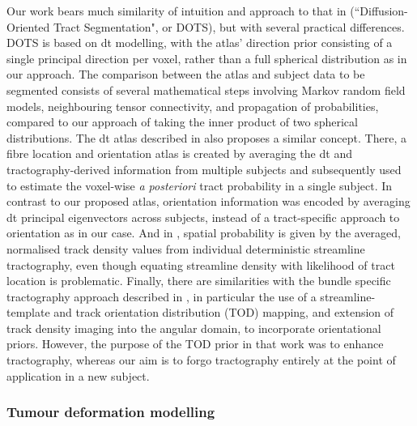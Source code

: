 Our work bears much similarity of intuition and approach to that in \textcite{Bazin2011} (``Diffusion-Oriented Tract Segmentation", or DOTS), but with several practical differences.
DOTS is based on \gls{dt} modelling, with the atlas' direction prior consisting of a single principal direction per voxel, rather than a full spherical distribution as in our approach.
The comparison between the atlas and subject data to be segmented consists of several mathematical steps involving Markov random field models, neighbouring tensor connectivity, and propagation of probabilities, compared to our approach of taking the inner product of two spherical distributions.
The \gls{dt} atlas described in \textcite{Hagler2009} also proposes a similar concept.
There, a fibre location and orientation atlas is created by averaging the \gls{dt} and tractography-derived information from multiple subjects and subsequently used to estimate the voxel-wise \textit{a posteriori} tract probability in a single subject.
In contrast to our proposed atlas, orientation information was encoded by averaging \gls{dt} principal eigenvectors across subjects, instead of a tract-specific approach to orientation as in our case.
And in \textcite{Hagler2009}, spatial probability is given by the averaged, normalised track density values from individual deterministic streamline tractography, even though equating streamline density with likelihood of tract location is problematic.\autocite{Rheault2019,Smith2013}
Finally, there are similarities with the bundle specific tractography approach described in \textcite{Rheault2019}, in particular the use of a streamline-template and track orientation distribution (TOD) mapping,\autocite{Dhollander2014} and extension of track density imaging\autocite{Calamante2010} into the angular domain, to incorporate orientational priors.
However, the purpose of the TOD prior in that work was to enhance tractography, whereas our aim is to forgo tractography entirely at the point of application in a new subject.

\subsubsection{Tumour deformation modelling}


